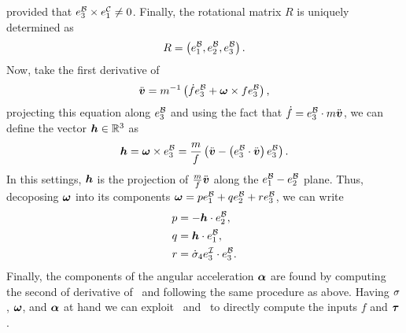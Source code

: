 provided that $e_3^{\mathcal{B}} \times e_1^{\mathcal{C}} \ne 0$.
Finally, the rotational matrix $R$ is uniquely determined as
\begin{equation*}
    R = \left( e_1^{\mathcal{B}}, e_2^{\mathcal{B}}, e_3^{\mathcal{B}} \right).
\end{equation*}
Now, take the first derivative of~
\begin{equation*}
    \ddot{\boldsymbol{v}} = m^{-1} \left( \dot{f}e_3^{\mathcal{B}} + \boldsymbol{\omega} \times f e_3^{\mathcal{B}} \right),
\end{equation*}
projecting this equation along $e_3^{\mathcal{B}}$ and using the fact that $\dot{f} = e_3^{\mathcal{B}} \cdot m\ddot{\boldsymbol{v}}$,
we can define the vector $\boldsymbol{h} \in \mathbb{R}^3$ as
\begin{equation*}
    \boldsymbol{h} = \boldsymbol{\omega} \times e_3^{\mathcal{B}} = \frac{m}{f} \left( \ddot{\boldsymbol{v}} - \left( e_3^{\mathcal{B}} \cdot \ddot{\boldsymbol{v}} \right) e_3^{\mathcal{B}} \right).
\end{equation*}
In this settings, $\boldsymbol{h}$ is the projection of $\frac{m}{f} \ddot{\boldsymbol{v}}$ along the $e_1^{\mathcal{B}}-e_2^{\mathcal{B}}$ plane.
Thus, decoposing $\boldsymbol{\omega}$ into its components $\boldsymbol{\omega} = pe_1^{\mathcal{B}} + qe_2^{\mathcal{B}} + re_3^{\mathcal{B}}$, we can write
\begin{equation*}
    \begin{split}
        p & = - \boldsymbol{h} \cdot e_2^{\mathcal{B}}, \\
        q & = \boldsymbol{h} \cdot e_1^{\mathcal{B}}, \\
        r & = \dot{\sigma}_4 e_3^{\mathcal{I}} \cdot e_3^{\mathcal{B}}.
    \end{split}
\end{equation*}
Finally, the components of the angular acceleration $\boldsymbol{\alpha}$ are found by computing the second of derivative of~
and following the same procedure as above.
Having $\sigma$, $\boldsymbol{\omega}$, and $\boldsymbol{\alpha}$ at hand we can exploit~ and~
to directly compute the inputs $f$ and $\boldsymbol{\tau}$.

